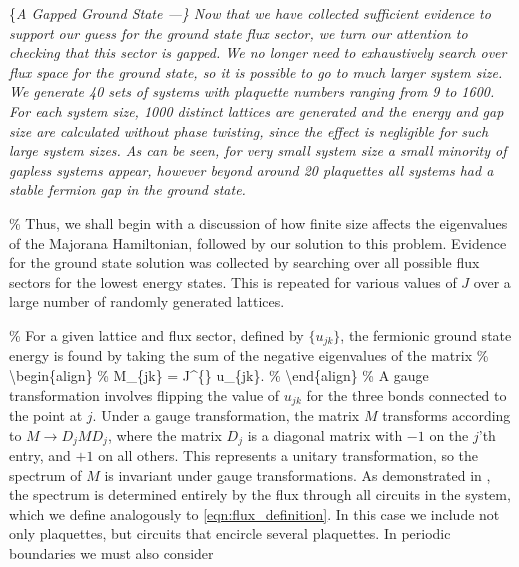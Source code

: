 \par

\{\it A Gapped Ground State ---\} Now that we have collected sufficient
evidence to support our guess for the ground state flux sector, we turn
our attention to checking that this sector is gapped. We no longer need
to exhaustively search over flux space for the ground state, so it is
possible to go to much larger system size. We generate 40 sets of
systems with plaquette numbers ranging from 9 to 1600. For each system
size, 1000 distinct lattices are generated and the energy and gap size
are calculated without phase twisting, since the effect is negligible
for such large system sizes. As can be seen, for very small system size
a small minority of gapless systems appear, however beyond around 20
plaquettes all systems had a stable fermion gap in the ground state.

\% Thus, we shall begin with a discussion of how finite size affects the
eigenvalues of the Majorana Hamiltonian, followed by our solution to
this problem. Evidence for the ground state solution was collected by
searching over all possible flux sectors for the lowest energy states.
This is repeated for various values of \(J\) over a large number of
randomly generated lattices.

\par

\% For a given lattice and flux sector, defined by \(\{ u_{jk}\}\), the
fermionic ground state energy is found by taking the sum of the negative
eigenvalues of the matrix \% \textbackslash begin\{align\} \% M\_\{jk\}
=  J\^{}\{\alpha\} u\_\{jk\}. \% \textbackslash end\{align\}
\% A gauge transformation involves flipping the value of \(u_{jk}\) for
the three bonds connected to the point at \(j\). Under a gauge
transformation, the matrix \(M\) transforms according to
\(M \rightarrow D_j M D_j\), where the matrix \(D_j\) is a diagonal
matrix with \(-1\) on the \(j\)'th entry, and \(+1\) on all others. This
represents a unitary transformation, so the spectrum of \(M\) is
invariant under gauge transformations. As demonstrated in
\cite{Lieb2004}, the spectrum is determined entirely by the flux through
all circuits in the system, which we define analogously to
\ref{eqn:flux_definition}. In this case we include not only plaquettes,
but circuits that encircle several plaquettes. In periodic boundaries we
must also consider

